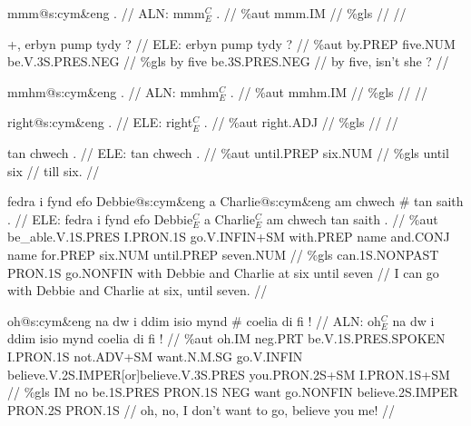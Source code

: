 \documentclass[a4paper,10pt]{article}
\begin{document}
\ex
\begingl[lingstyle=gergl]
\glchat mmm@s:cym\&eng . //
\glsurface ALN:  mmm$^{C}_{E}$ .  //
\glauto \%aut  mmm{\scriptsize .IM}   //
\glmanual \%gls     //
\gleng  //
\endgl
\xe

\ex
\begingl[lingstyle=gergl]
\glchat +, erbyn pump tydy ? //
\glsurface ELE:  erbyn pump tydy ?  //
\glauto \%aut  by{\scriptsize .PREP} five{\scriptsize .NUM} be{\scriptsize .V.3S.PRES.NEG}   //
\glmanual \%gls  by five be{\scriptsize .3S.PRES.NEG}   //
\gleng by five, isn't she ? //
\endgl
\xe

\ex
\begingl[lingstyle=gergl]
\glchat mmhm@s:cym\&eng . //
\glsurface ALN:  mmhm$^{C}_{E}$ .  //
\glauto \%aut  mmhm{\scriptsize .IM}   //
\glmanual \%gls     //
\gleng  //
\endgl
\xe

\ex
\begingl[lingstyle=gergl]
\glchat right@s:cym\&eng . //
\glsurface ELE:  right$^{C}_{E}$ .  //
\glauto \%aut  right{\scriptsize .ADJ}   //
\glmanual \%gls     //
\gleng  //
\endgl
\xe

\ex
\begingl[lingstyle=gergl]
\glchat tan chwech . //
\glsurface ELE:  tan chwech .  //
\glauto \%aut  until{\scriptsize .PREP} six{\scriptsize .NUM}   //
\glmanual \%gls  until six   //
\gleng till six. //
\endgl
\xe

\ex
\begingl[lingstyle=gergl]
\glchat fedra i fynd efo Debbie@s:cym\&eng a Charlie@s:cym\&eng am chwech \# tan saith . //
\glsurface ELE:  fedra i fynd efo Debbie$^{C}_{E}$ a Charlie$^{C}_{E}$ am chwech tan saith .  //
\glauto \%aut  be\_able{\scriptsize .V.1S.PRES} I{\scriptsize .PRON.1S} go{\scriptsize .V.INFIN+SM} with{\scriptsize .PREP} name and{\scriptsize .CONJ} name for{\scriptsize .PREP} six{\scriptsize .NUM} until{\scriptsize .PREP} seven{\scriptsize .NUM}   //
\glmanual \%gls  can{\scriptsize .1S.NONPAST} PRON{\scriptsize .1S} go{\scriptsize .NONFIN} with Debbie and Charlie at six until seven   //
\gleng I can go with Debbie and Charlie at six, until seven. //
\endgl
\xe

\ex
\begingl[lingstyle=gergl]
\glchat oh@s:cym\&eng na dw i ddim isio mynd \# coelia di fi ! //
\glsurface ALN:  oh$^{C}_{E}$ na dw i ddim isio mynd coelia di fi !  //
\glauto \%aut  oh{\scriptsize .IM} neg{\scriptsize .PRT} be{\scriptsize .V.1S.PRES.SPOKEN} I{\scriptsize .PRON.1S} not{\scriptsize .ADV+SM} want{\scriptsize .N.M.SG} go{\scriptsize .V.INFIN} believe{\scriptsize .V.2S.IMPER[or]believe.V.3S.PRES} you{\scriptsize .PRON.2S+SM} I{\scriptsize .PRON.1S+SM}   //
\glmanual \%gls  IM no be{\scriptsize .1S.PRES} PRON{\scriptsize .1S} NEG want go{\scriptsize .NONFIN} believe{\scriptsize .2S.IMPER} PRON{\scriptsize .2S} PRON{\scriptsize .1S}   //
\gleng oh, no, I don't want to go, believe you me! //
\endgl
\xe
\end{document}

